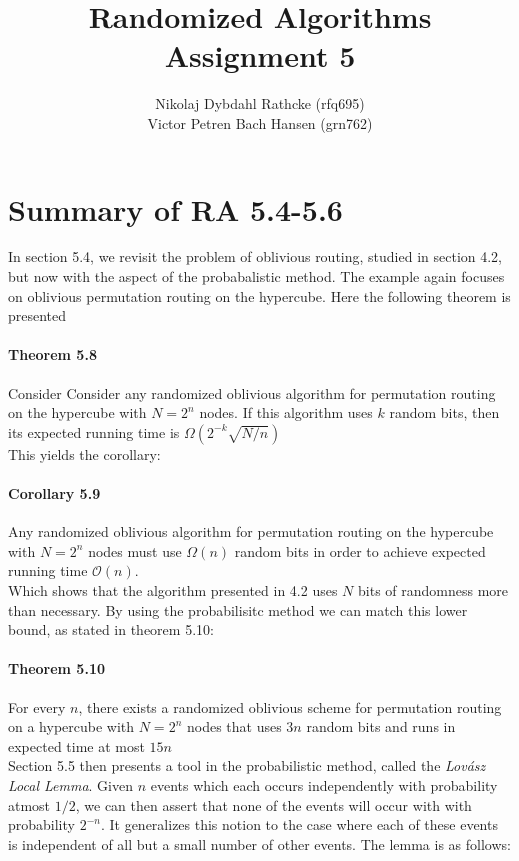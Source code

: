 \documentclass[a4paper, fleqn]{article}
\author{Nikolaj Dybdahl Rathcke (rfq695) \\ Victor Petren Bach Hansen (grn762)}
\title{Randomized Algorithms \\ Assignment 5}
\begin{document}
\maketitle

\section*{Summary of RA 5.4-5.6}
In section 5.4, we revisit the problem of oblivious routing, studied in section 4.2, but now with the aspect of the probabalistic method. The example again focuses on oblivious permutation routing on the hypercube. Here the following theorem is presented
\paragraph{Theorem 5.8} Consider Consider any randomized oblivious algorithm for permutation routing on the hypercube with $N=2^n$ nodes. If this algorithm uses $k$  random bits, then its expected running time is $\Omega(2^{-k} \sqrt{N/n})$\\

This yields the corollary:
\paragraph{Corollary 5.9} Any randomized oblivious algorithm for permutation routing on the hypercube with $N=2^n$ nodes must use $\Omega(n)$ random bits in order to achieve expected running time $\mathcal{O}(n)$.\\

Which shows that the algorithm presented in 4.2 uses $N$ bits of randomness more than necessary. By using the probabilisitc method we can match this lower bound, as stated in theorem 5.10:
\paragraph{Theorem 5.10} For every $n$, there exists a randomized oblivious scheme for permutation routing on a hypercube with $N = 2^n$ nodes that uses $3n$ random bits and runs in expected time at most $15n$\\

Section 5.5 then presents a tool in the probabilistic method, called the \textit{Lovász Local Lemma}. Given $n$ events which each occurs independently with probability atmost $1/2$, we can then assert that none of the events will occur with with probability $2^{-n}$. It generalizes this notion to the case where each of these events is independent of all but a small number of other events. The lemma is as follows:
\end{document}
